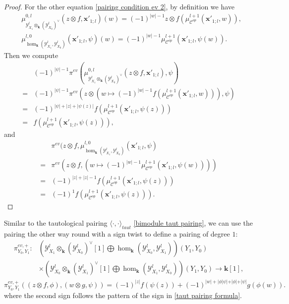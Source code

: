 \documentclass[11pt]{amsproc}
\def\K{{\mathbf{k}}}
\def\Y{\mathcal{Y}}
\def\cc{\mathcal{C}}
\theoremstyle{remark}
\numberwithin{equation}{section}
\begin{document}
\begin{proof}
For the other equation \eqref{pairing condition ev 2},
by definition we have
\begin{align}
& \mu_{\Y^{l}_{X_{1}} \otimes_{\K} (\Y^{l}_{X_{0}})^{\vee}}^{0, l}(z \otimes f, \mathbf{x}'_{1;l})(w) = (-1)^{|w|-1} z \otimes f(\mu_{\cc^{op}}^{l+1}(\mathbf{x}'_{1;l}, w)), \\
& \mu_{\hom_{\K}(\Y^{l}_{X_{1}}, \Y^{l}_{X_{0}})}^{l, 0}(\mathbf{x}'_{1;l}, \psi)(w) = (-1)^{ |w| -1} \mu^{l+1}_{\cc^{op}}(\mathbf{x}'_{1;l}, \psi(w)). 
\end{align}
Then we compute
\begin{equation}
\begin{split}
& (-1)^{|\psi|-1} \pi^{ev}(\mu_{\Y^{l}_{X_{1}} \otimes_{\K} (\Y^{l}_{X_{0}})^{\vee}}^{0, l}(z \otimes f, \mathbf{x}'_{1;l}), \psi) \\
= & (-1)^{|\psi|-1} \pi^{ev}(z \otimes (w \mapsto (-1)^{|w|-1} f(\mu_{\cc^{op}}^{l+1}(\mathbf{x}'_{1;l}, w))), \psi) \\
= & (-1)^{|\psi| + |z| + |\psi(z)|} f(\mu_{\cc^{op}}^{l+1}(\mathbf{x}'_{1;l}, \psi(z)))\\
= & f(\mu_{\cc^{op}}^{l+1}(\mathbf{x}'_{1;l}, \psi(z))),
\end{split}
\end{equation}
and
\begin{equation}
\begin{split}
& \pi^{ev}(z \otimes f, \mu_{\hom_{\K}(\Y^{l}_{X_{1}}, \Y^{l}_{X_{0}})}^{l, 0}(\mathbf{x}'_{1;l}, \psi) \\
= & \pi^{ev}(z \otimes f, (w \mapsto (-1)^{ |w| - 1} \mu^{l+1}_{\cc^{op}}(\mathbf{x}'_{1;l}, \psi(w)))) \\
= & (-1)^{|z| + |z| -1} f(\mu_{\cc^{op}}^{l+1}(\mathbf{x}'_{1;l}, \psi(z))) \\
= & (-1)^{1} f(\mu_{\cc^{op}}^{l+1}(\mathbf{x}'_{1;l}, \psi(z))).
\end{split}
\end{equation}
\end{proof}

Similar to the tautological pairing $\langle \cdot, \cdot \rangle_{taut}$ \eqref{bimodule taut pairing},
we can use the pairing the other way round with a sign twist to define a pairing of degree $1$:
\begin{equation}\label{pre pairing on Z}
\begin{split}
\pi^{ev, +}_{Y_{0}, Y_{1}}: & (\Y^{l}_{X_{1}} \otimes_{\K} (\Y^{l}_{X_{0}})^{\vee}[1] \bigoplus \hom_{\K}(\Y^{l}_{X_{0}}, \Y^{l}_{X_{1}}))(Y_{1}, Y_{0}) \\
& \times (\Y^{l}_{X_{0}} \otimes_{\K} (\Y^{l}_{X_{1}})^{\vee}[1] \bigoplus \hom_{\K}(\Y^{l}_{X_{1}}, \Y^{l}_{X_{0}}))(Y_{1}, Y_{0}) \to \K[1],
\end{split}
\end{equation}
\begin{equation}\label{pre pairing on Z formula}
\pi^{ev, +}_{Y_{0}, Y_{1}}( (z \otimes f, \phi), (w \otimes g, \psi)) =  (-1)^{|z|} f(\psi(z)) + (-1)^{|w| + |\phi|\psi| + |\phi| + |\psi|} g(\phi(w)).
\end{equation}
where the second sign follows the pattern of the sign in \eqref{taut pairing formula}.
\end{document}

